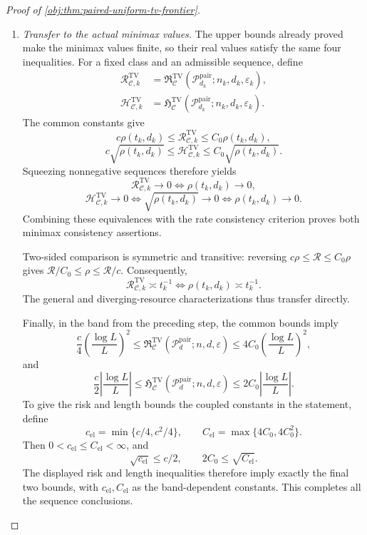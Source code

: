 \begin{proof}[Proof of \cref{obj:thm:paired-uniform-tv-frontier}]
\begin{enumerate}
\item \textit{Transfer to the actual minimax values.}
The upper bounds already proved make the minimax values finite, so their real values satisfy the same four inequalities. For a fixed class and an admissible sequence, define
\[
\begin{aligned}
\mathcal R_{\mathcal C,k}^{\mathrm{TV}}
&=\mathfrak R^{\mathrm{TV}}_{\mathcal C}
(\mathcal P_{d_k}^{\mathrm{pair}};n_k,d_k,\varepsilon_k),\\
\mathcal H_{\mathcal C,k}^{\mathrm{TV}}
&=\mathfrak H^{\mathrm{TV}}_{\mathcal C}
(\mathcal P_{d_k}^{\mathrm{pair}};n_k,d_k,\varepsilon_k).
\end{aligned}
\]
The common constants give
\[
c\rho(t_k,d_k)\le\mathcal R_{\mathcal C,k}^{\mathrm{TV}}
\le C_0\rho(t_k,d_k),
\]
\[
c\sqrt{\rho(t_k,d_k)}
\le\mathcal H_{\mathcal C,k}^{\mathrm{TV}}
\le C_0\sqrt{\rho(t_k,d_k)}.
\]
Squeezing nonnegative sequences therefore yields
\[
\mathcal R_{\mathcal C,k}^{\mathrm{TV}}\to0
\Longleftrightarrow\rho(t_k,d_k)\to0,
\]
\[
\mathcal H_{\mathcal C,k}^{\mathrm{TV}}\to0
\Longleftrightarrow\sqrt{\rho(t_k,d_k)}\to0
\Longleftrightarrow\rho(t_k,d_k)\to0.
\]
Combining these equivalences with the rate consistency criterion proves both minimax consistency assertions.

Two-sided comparison is symmetric and transitive: reversing
\(c\rho\le\mathcal R\le C_0\rho\) gives
\(\mathcal R/C_0\le\rho\le\mathcal R/c\).
Consequently,
\[
\mathcal R_{\mathcal C,k}^{\mathrm{TV}}\asymp t_k^{-1}
\Longleftrightarrow
\rho(t_k,d_k)\asymp t_k^{-1}.
\]
The general and diverging-resource characterizations thus transfer directly.

Finally, in the band from the preceding step, the common bounds imply
\[
\frac c4\left(\frac{\log L}{L}\right)^2
\le
\mathfrak R^{\mathrm{TV}}_{\mathcal C}
(\mathcal P_d^{\mathrm{pair}};n,d,\varepsilon)
\le
4C_0\left(\frac{\log L}{L}\right)^2,
\]
and
\[
\frac c2\left|\frac{\log L}{L}\right|
\le
\mathfrak H^{\mathrm{TV}}_{\mathcal C}
(\mathcal P_d^{\mathrm{pair}};n,d,\varepsilon)
\le
2C_0\left|\frac{\log L}{L}\right|.
\]
To give the risk and length bounds the coupled constants in the statement, define
\[
c_{\mathrm{el}}=\min\{c/4,c^2/4\},
\qquad
C_{\mathrm{el}}=\max\{4C_0,4C_0^2\}.
\]
Then \(0<c_{\mathrm{el}}\le C_{\mathrm{el}}<\infty\), and
\[
\sqrt{c_{\mathrm{el}}}\le c/2,
\qquad
2C_0\le\sqrt{C_{\mathrm{el}}}.
\]
The displayed risk and length inequalities therefore imply exactly the final two bounds, with \(c_{\mathrm{el}},C_{\mathrm{el}}\) as the band-dependent constants. This completes all the sequence conclusions.
\end{enumerate}
\end{proof}

